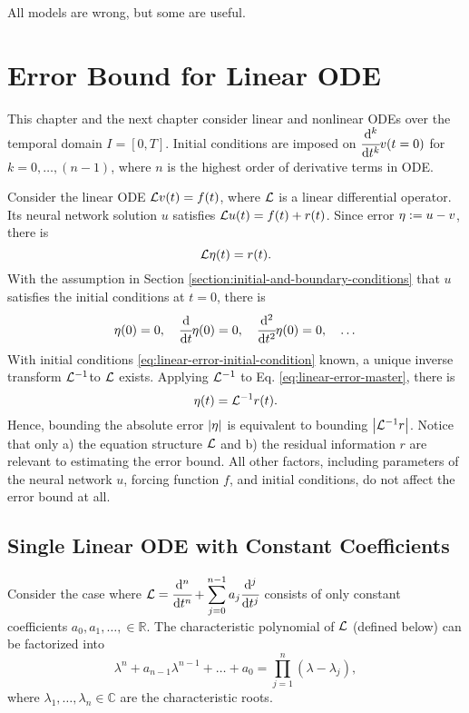 \begin{savequote}[75mm]
    All models are wrong, but some are useful.
\end{savequote}

\chapter{Error Bound for Linear ODE}  \label{chapter:error-bound-for-linear-odes}
    This chapter and the next chapter consider linear and nonlinear ODEs over the temporal domain $I=[0, T]$. 
    Initial conditions are imposed on $\cfrac{\mathrm{d}^k}{\mathrm{d}t^k}v(t=0)$ for $k = 0, \dots, (n - 1)$, where $n$ is the highest order of derivative terms in ODE.

    Consider the linear ODE $\mathcal{L} v(t) = f(t)$, where $\mathcal{L}$ is a linear differential operator. 
    Its neural network solution $u$ satisfies $\mathcal{L} u(t) = f(t) + r(t)$. 
    Since error $\eta := u - v$, there is
    \begin{equation} \label{eq:linear-error-master}
        \mathcal{L} \eta(t) = r(t).
    \end{equation}
    With the assumption in Section \ref{section:initial-and-boundary-conditions} that $u$ satisfies the initial conditions at $t=0$, there is
    \begin{equation} \label{eq:linear-error-initial-condition}
        \eta(0) = 0, \quad \cfrac{\mathrm{d} }{\mathrm{d} t}{}\eta(0) = 0, \quad \cfrac{\mathrm{d}^{2} }{\mathrm{d} t^{2}}\eta(0) = 0, \quad \dots 
    \end{equation}
    With initial conditions \eqref{eq:linear-error-initial-condition} known, a unique inverse transform $\mathcal{L}^{-1}$to $\mathcal{L}$ exists. 
    Applying $\mathcal{L}^{-1}$ to Eq. \eqref{eq:linear-error-master}, there is 
    \begin{equation}\label{eq:linear-error-inverse-master}
        \eta(t) = \mathcal{L}^{-1} r(t).
    \end{equation}
    Hence, bounding the absolute error $\left|\eta\right|$ is equivalent to bounding $\left|\mathcal{L}^{-1} r\right|$. 
    Notice that only a) the equation structure $\mathcal{L}$ and b) the residual information $r$ are relevant to estimating the error bound. 
    All other factors, including parameters of the neural network $u$, forcing function $f$, and initial conditions, do not affect the error bound at all.

\section{Single Linear ODE with Constant Coefficients}\label{section:single-linear-ode-with-constant-coefficients}
    Consider the case where $\displaystyle \mathcal{L} = \cfrac{\mathrm{d}^{n} }{\mathrm{d} t^{n}} + \sum_{j=0}^{n - 1} a_j \cfrac{\mathrm{d}^{j} }{\mathrm{d} t^{j}}$ consists of only constant coefficients $a_0, a_1, \dots, \in \mathbb{R}$.
    The characteristic polynomial of $\mathcal{L}$ (defined below) can be factorized into
    \begin{equation} \label{eq:single-linear-ode-characteristic-polynomial-factorization}
        \lambda^n + a_{n-1}\lambda^{n-1} + \dots + a_0 = \prod_{j=1}^{n}(\lambda - \lambda_j),
    \end{equation}
    where $\lambda_1, \dots, \lambda_n \in \mathbb{C}$ are the characteristic roots. 

